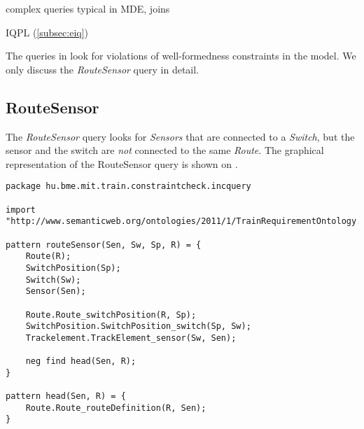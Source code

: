 complex queries typical in MDE, joins

IQPL (\autoref{subsec:eiq})


The queries in \tb{} look for violations of well-formedness constraints in the model. We only discuss the \textit{RouteSensor} query in detail.

\subsection{RouteSensor}

The \textit{RouteSensor} query looks for \textit{Sensors} that are connected to a \textit{Switch}, but the sensor and the switch are \textit{not} connected to the same \textit{Route}. The graphical representation of the RouteSensor query is shown on .








\begin{lstlisting}[caption=The RouteSensor query in IQPL, label=lst:routesensor-iqpl]
package hu.bme.mit.train.constraintcheck.incquery

import "http://www.semanticweb.org/ontologies/2011/1/TrainRequirementOntology.owl" 

pattern routeSensor(Sen, Sw, Sp, R) = {
	Route(R);
	SwitchPosition(Sp);
	Switch(Sw);
	Sensor(Sen);
	
	Route.Route_switchPosition(R, Sp);
	SwitchPosition.SwitchPosition_switch(Sp, Sw);
	Trackelement.TrackElement_sensor(Sw, Sen);
	
	neg find head(Sen, R);	
}

pattern head(Sen, R) = {
	Route.Route_routeDefinition(R, Sen);
}
\end{lstlisting}





% 
% 
% 



